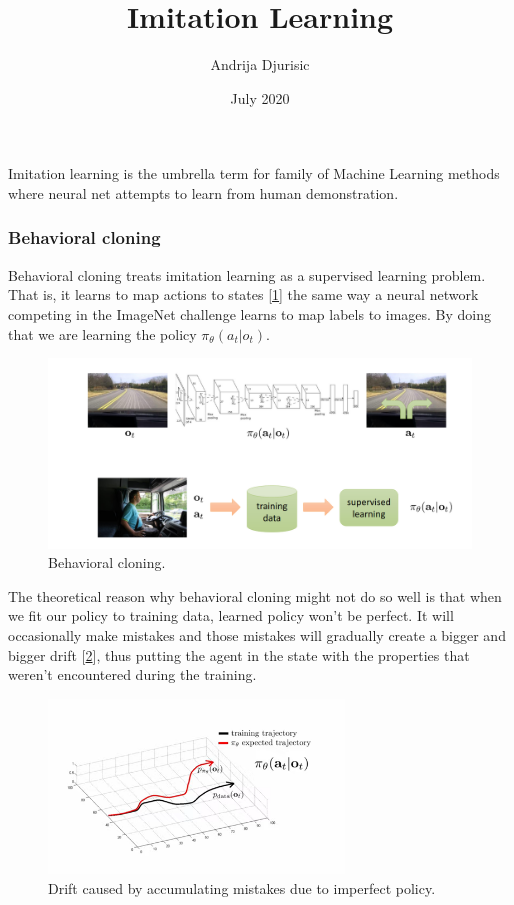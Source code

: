 \documentclass[a4paper]{article}
\title{Imitation Learning}
\author{Andrija Djurisic}
\date{July 2020}
\begin{document}
	\maketitle

Imitation learning is the umbrella term for family of Machine Learning methods where neural net attempts to learn from human demonstration.

\subsubsection*{Behavioral cloning}
Behavioral cloning treats imitation learning as a supervised learning problem. That is, it learns to map actions to states [\ref{fig:behavioral_cloning}] the same way a neural network competing in the ImageNet challenge learns to map labels to images. By doing that we are learning the policy $\pi_{\theta}(a_{t}|{o}_{t})$.

\begin{figure}[h]
	\includegraphics[width=\linewidth]{imgs_tex/bh.png}
	\caption{Behavioral cloning.}
	\label{fig:behavioral_cloning}
\end{figure}

The theoretical reason why behavioral cloning might not do so well is that when we fit our policy to training data, learned policy won't be perfect. It will occasionally make mistakes and those mistakes will gradually create a bigger and bigger drift [\ref{fig:drift}], thus putting the agent in the state with the properties that weren't encountered during the training.

\pagebreak

\begin{figure}[h]
	\includegraphics[width=0.7\textwidth, center]{imgs_tex/drift.png}
	\caption{Drift caused by accumulating mistakes due to imperfect policy.}
	\label{fig:drift}
\end{figure}
\end{document}
